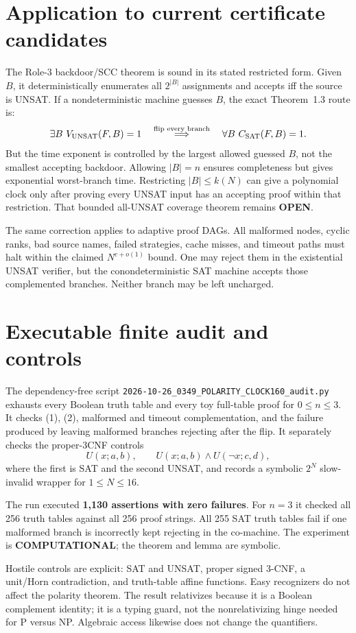 \documentclass[11pt]{article}
\newcommand{\status}[1]{\textbf{#1}}
\begin{document}
\section*{Application to current certificate candidates}
The Role-3 backdoor/SCC theorem is sound in its stated restricted form.  Given
$B$, it deterministically enumerates all $2^{|B|}$ assignments and accepts iff
the source is UNSAT.  If a nondeterministic machine guesses $B$, the exact
Theorem~1.3 route is:
\[
\exists B\ V_{\rm UNSAT}(F,B)=1
\quad\stackrel{\text{flip every branch}}{\Longrightarrow}\quad
\forall B\ C_{\rm SAT}(F,B)=1.
\]
But the time exponent is controlled by the largest allowed guessed $B$, not
the smallest accepting backdoor.  Allowing $|B|=n$ ensures completeness but
gives exponential worst-branch time.  Restricting $|B|\le k(N)$ can give a
polynomial clock only after proving every UNSAT input has an accepting proof
within that restriction.  That bounded all-UNSAT coverage theorem remains
\status{OPEN}.

The same correction applies to adaptive proof DAGs.  All malformed nodes,
cyclic ranks, bad source names, failed strategies, cache misses, and timeout
paths must halt within the claimed $N^{c+o(1)}$ bound.  One may reject them in
the existential UNSAT verifier, but the conondeterministic SAT machine accepts
those complemented branches.  Neither branch may be left uncharged.

\section*{Executable finite audit and controls}
The dependency-free script
\texttt{2026-10-26\_0349\_POLARITY\_CLOCK160\_audit.py} exhausts every Boolean
truth table and every toy full-table proof for $0\le n\le3$.  It checks (1),
(2), malformed and timeout complementation, and the failure produced by
leaving malformed branches rejecting after the flip.  It separately checks
the proper-3CNF controls
\[
U(x;a,b),\qquad U(x;a,b)\wedge U(\neg x;c,d),
\]
where the first is SAT and the second UNSAT, and records a symbolic
$2^N$ slow-invalid wrapper for $1\le N\le16$.

The run executed \textbf{1,130 assertions with zero failures}.  For $n=3$ it
checked all 256 truth tables against all 256 proof strings.  All 255 SAT truth
tables fail if one malformed branch is incorrectly kept rejecting in the
co-machine.  The experiment is \status{COMPUTATIONAL}; the theorem and lemma
are symbolic.

Hostile controls are explicit: SAT and UNSAT, proper signed 3-CNF, a unit/Horn
contradiction, and truth-table affine functions.  Easy recognizers do not
affect the polarity theorem.  The result relativizes because it is a Boolean
complement identity; it is a typing guard, not the nonrelativizing hinge needed
for P versus NP.  Algebraic access likewise does not change the quantifiers.
\end{document}
